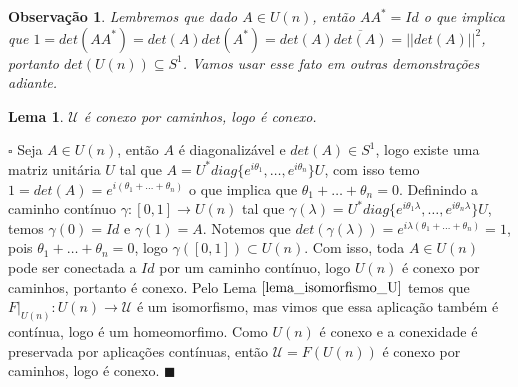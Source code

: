 \documentclass[12pt]{book}
\newtheorem{lema}[teorema]{Lema}
\newtheorem{observacao}[teorema]{Observação}
\newenvironment{prova}[1]{$\square$ #1}{\hfill$\blacksquare$}
\newcommand{\matrizunitaria}[1]{U(#1)}
\begin{document}
	\begin{observacao}\label{observacao_determinante_matriz_unitaria}
		Lembremos que dado $A \in \matrizunitaria{n}$, então $AA^{*} = Id$ o que implica que $1= det(AA^{*}) = det(A)det(A^{*}) = det(A)\overline{det(A)} = ||det(A)||^{2}$, portanto $det(\matrizunitaria{n}) \subseteq S^{1}$. Vamos usar esse fato em outras demonstrações adiante.
	\end{observacao}
	
	
	\begin{lema}
		$\mathcal{U}$ é conexo por caminhos, logo é conexo.
	\end{lema}
	\begin{prova}
		Seja $A \in \matrizunitaria{n}$, então $A$ é diagonalizável e $det(A) \in S^{1}$, logo existe uma matriz unitária $U$ tal que $A=U^{*}diag\{e^{i\theta_{1}}, \dots, e^{i\theta_{n}}\}U$, com isso temo $1 = det(A) = e^{i(\theta_{1}+\dots+\theta_{n})}$ o que implica que $\theta_{1}+\dots+\theta_{n}=0$. Definindo a caminho contínuo $\gamma:[0,1] \to \matrizunitaria{n}$ tal que $\gamma(\lambda)=U^{*}diag\{e^{i\theta_{1}\lambda}, \dots, e^{i\theta_{n}\lambda}\}U$, temos $\gamma(0)=Id$ e $\gamma(1)=A$. Notemos que $det(\gamma(\lambda)) = e^{i\lambda(\theta_{1}+\dots+\theta_{n})} = 1$, pois $\theta_{1}+\dots+\theta_{n}=0$, logo $\gamma([0,1]) \subset \matrizunitaria{n}$. Com isso, toda $A \in \matrizunitaria{n}$ pode ser conectada a $Id$ por um caminho contínuo, logo $\matrizunitaria{n}$ é conexo por caminhos, portanto é conexo. Pelo Lema $\ref{lema_isomorfismo_U}$ temos que $F|_{\matrizunitaria{n}}:\matrizunitaria{n} \to \mathcal{U}$ é um isomorfismo, mas vimos que essa aplicação também é contínua, logo é um homeomorfimo. Como $\matrizunitaria{n}$ é conexo e a conexidade é preservada por aplicações contínuas, então $\mathcal{U} = F(\matrizunitaria{n})$ é conexo por caminhos, logo é conexo.
	\end{prova}
\end{document}
